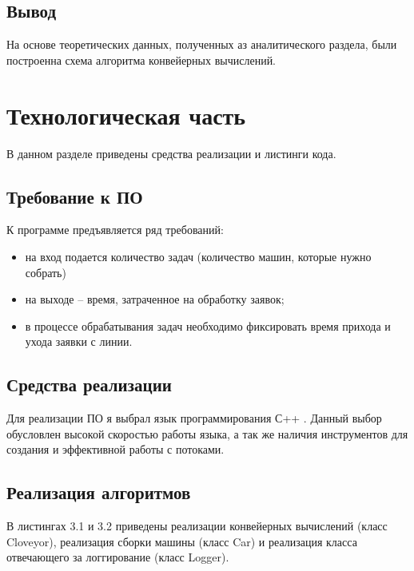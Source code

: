 \documentclass[12pt]{report}
\begin{document}
\section*{Вывод}
На основе теоретических данных, полученных аз аналитического раздела, были построенна схема алгоритма конвейерных вычислений.

\chapter{Технологическая часть}

В данном разделе приведены средства реализации и листинги кода.

\section{Требование к ПО}

К программе предъявляется ряд требований:

\begin{itemize}
	\item на вход подается количество задач (количество машин, которые нужно собрать)
	\item на выходе -- время, затраченное на обработку заявок;
	\item в процессе обрабатывания задач необходимо фиксировать время прихода и ухода заявки с линии.
\end{itemize}

\section{Средства реализации}

Для реализации ПО я выбрал язык программирования С++ \cite{C++}. Данный выбор обусловлен высокой скоростью работы языка, а так же наличия инструментов для создания и эффективной работы с потоками.

\section{Реализация алгоритмов}

В листингах 3.1 и 3.2 приведены реализации конвейерных вычислений (класс Cloveyor), реализация сборки машины (класс Car) и реализация класса отвечающего за логгирование (класс Logger).
\end{document}
